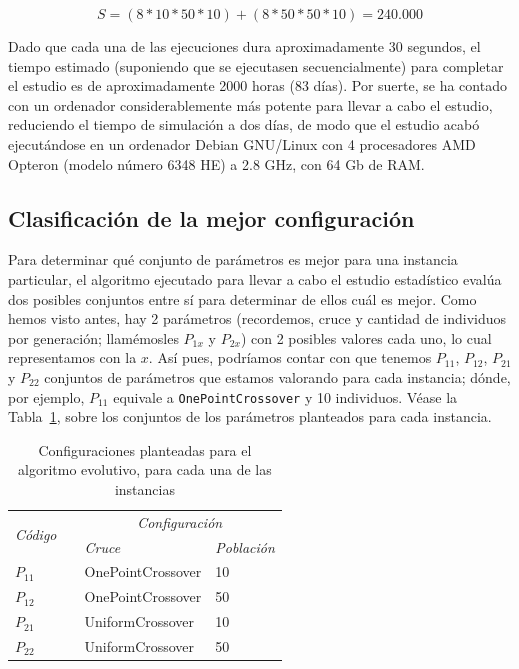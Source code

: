 $$
S = (8*10*50*10) + (8*50*50*10) = 240.000
$$

Dado que cada una de las ejecuciones dura aproximadamente 30 segundos, el tiempo estimado (suponiendo que se ejecutasen secuencialmente) para completar el estudio es de aproximadamente 2000 horas (83 días). Por suerte, se ha contado con un ordenador considerablemente más potente para llevar a cabo el estudio, reduciendo el tiempo de simulación a dos días, de modo que el estudio acabó ejecutándose en un ordenador Debian GNU/Linux con 4 procesadores AMD\textregistered{} Opteron\texttrademark{} (modelo número 6348 HE) a 2.8 GHz, con 64 Gb de RAM.

\subsection{Clasificación de la mejor configuración}

Para determinar qué conjunto de parámetros es mejor para una instancia particular, el algoritmo ejecutado para llevar a cabo el estudio estadístico evalúa dos posibles conjuntos entre sí para determinar de ellos cuál es mejor. Como hemos visto antes, hay 2 parámetros (recordemos, cruce y cantidad de individuos por generación; llamémosles $P_{1x}$ y $P_{2x}$) con 2 posibles valores cada uno, lo cual representamos con la $x$. Así pues, podríamos contar con que tenemos $P_{11}$, $P_{12}$, $P_{21}$ y $P_{22}$ conjuntos de parámetros que estamos valorando para cada instancia; dónde, por ejemplo, $P_{11}$ equivale a \texttt{OnePointCrossover} y 10 individuos. Véase la Tabla~\ref{tab:configuraciones}, sobre los conjuntos de los parámetros planteados para cada instancia. 

\begin{table}[h]
\caption{Configuraciones planteadas para el algoritmo evolutivo, para cada una de las instancias}
\label{tab:configuraciones}
\centering
\begin{tabular}{llll}
\hline
\multicolumn{1}{c}{\multirow{2}{*}{\textit{Código}}} &  & \multicolumn{2}{c}{\textit{Configuración}} \\ \cline{3-4} 
\multicolumn{1}{c}{}                                 &  & \textit{Cruce}      & \textit{Población}   \\ \hline
$P_{11}$                                             &  & OnePointCrossover   & 10                   \\ \hline
$P_{12}$                                             &  & OnePointCrossover   & 50                   \\ \hline
$P_{21}$                                             &  & UniformCrossover    & 10                   \\ \hline
$P_{22}$                                             &  & UniformCrossover    & 50                   \\ \hline
\end{tabular}
\end{table}

